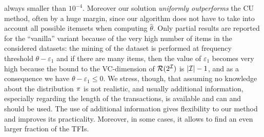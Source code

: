 always smaller than $10^{-4}$. Moreover our solution
\emph{uniformly outperforms} the CU method, often by a huge margin, since
 our algorithm does not have to take into account all
possible itemsets when computing $\hat\theta$. %
Only partial results are reported for the ``vanilla'' variant because of the
very high number of items in the considered datasets: the mining of the
dataset is performed at frequency threshold $\theta-\varepsilon_1$  and if there
are many items, then the value of $\varepsilon_1$ becomes very high because the
bound to the VC-dimension of $\mathcal{R}(2^{\cal I})$ is $|{\cal I}|-1$, and as a
consequence we have $\theta-\varepsilon_1\le 0$. %
We stress, though, that assuming no knowledge about the distribution $\pi$ is not realistic, and
usually additional information, especially regarding the length of the
transactions, is available and can and should be used. The use of
additional information gives flexibility to our method and improves its
practicality. Moreover, in some cases, it allows to find an even larger fraction
of the TFIs.

